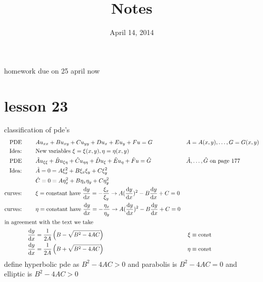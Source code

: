 \documentclass{article}
\begin{document}
\title{Notes}
\date{April 14, 2014}
\maketitle
homework due on 25 april now
\section*{lesson 23}
classification of pde's
\begin{align*}
  \text{PDE}&&&Au_{xx}+Bu_{xy}+Cu_{yy}+Du_{x}+Eu_y+Fu=G&A&=A(x,y),\dots,G=G(x,y)\\
  \text{Idea:}&&&\text{New variables }\xi=\xi(x,y),\eta=\eta(x,y)\\
  \text{PDE}&&&\hat{A}u_{\xi\xi}+\hat{B}u_{\xi\eta}+\hat{C}u_{\eta\eta}+\hat{D}u_{\xi}+\hat{E}u_\eta+\hat{F}u=\hat{G}&\hat{A}&,\dots,\hat{G}\text{ on page 177}\\
  \text{Idea:}&&&\hat{A}=0=A\xi_x^2+B\xi_x\xi_y+C\xi_y^2\\
  &&&\hat{C}=0=A\eta_x^2+B\eta_x\eta_y+C\eta_y^2\\
  \text{curves:}&&&\xi=\text{constant have }\frac{\mathrm{d}y}{\mathrm{d}x}=-\frac{\xi_x}{\xi_y}\to A(\frac{\mathrm{d}y}{\mathrm{d}x})^2-B\frac{\mathrm{d}y}{\mathrm{d}x}+C=0\\
  \text{curves:}&&&\eta=\text{constant have }\frac{\mathrm{d}y}{\mathrm{d}x}=-\frac{\eta_x}{\eta_y}\to A(\frac{\mathrm{d}y}{\mathrm{d}x})^2-B\frac{\mathrm{d}y}{\mathrm{d}x}+C=0\\
  \intertext{in agreement with the text we take}
  &&\frac{\mathrm{d}y}{\mathrm{d}x}&=\frac{1}{2A}\left(B-\sqrt{B^2-4AC}\right)&\xi&\equiv\text{const}\\
  &&\frac{\mathrm{d}y}{\mathrm{d}x}&=\frac{1}{2A}\left(B+\sqrt{B^2-4AC}\right)&\eta&\equiv\text{const}
\end{align*}
define hyperbolic pde as $B^2-4AC>0$ and parabolis is $B^2-4AC=0$ and elliptic is $B^2-4AC>0$
\end{document}
